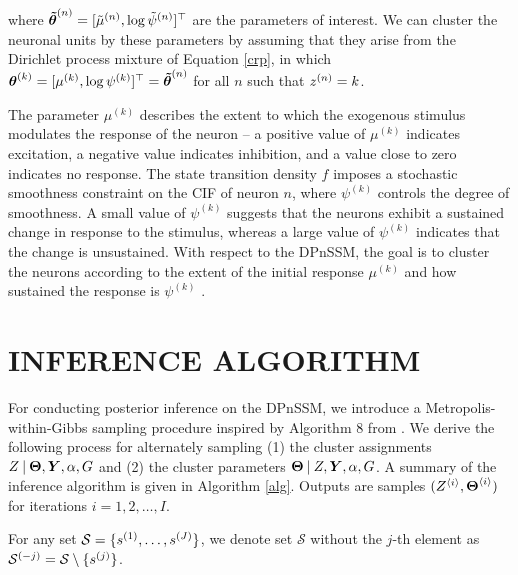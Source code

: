 \documentclass[twoside]{article}
\begin{document}
where $\boldsymbol{\tilde{\theta}}^{(n)}_{} = [{\tilde{\mu}}^{(n)}_{}, \log {\tilde{\psi}}^{(n)}_{}]^\top$ are the parameters of interest.  We can cluster the neuronal units by these parameters by assuming that they arise from the Dirichlet process mixture of Equation \ref{crp}, in which $\boldsymbol{\theta}^{(k)}_{} = [{\mu}^{(k)}_{}, \log {\psi}^{(k)}_{}]^\top = \boldsymbol{\tilde{\theta}}^{(n)}_{}$ for all $n$ such that ${z}^{(n)}_{} = k$.  

The parameter $\mu^{(k)} $ describes the extent to which the exogenous stimulus modulates the response of the neuron -- a positive value of $\mu^{(k)}$ indicates excitation, a negative value indicates inhibition, and a value close to zero indicates no response. The state transition density $f$ imposes a stochastic smoothness constraint on the CIF of neuron $n$, where $\psi^{(k)}$ controls the degree of smoothness.  A small value of $\psi^{(k)}$ suggests that the neurons exhibit a sustained change in response to the stimulus, whereas a large value of $\psi^{(k)}$ indicates that the change is unsustained.  With respect to the DPnSSM, the goal is to cluster the neurons according to the extent of the initial response $\mu^{(k)}$ and how sustained the response is $\psi^{(k)}$ . 

\section{INFERENCE ALGORITHM}
For conducting posterior inference on the DPnSSM, we introduce a Metropolis-within-Gibbs sampling procedure inspired by Algorithm 8 from \cite{neal2000markov}.  We derive the following process for alternately sampling (1) the cluster assignments $Z \:\vert\: \boldsymbol{\Theta}, \boldsymbol{Y}, \alpha, G$ and (2) the cluster parameters $\boldsymbol{\Theta} \:\vert\: Z, \boldsymbol{Y}, \alpha, G$.  A summary of the inference algorithm is given in Algorithm \ref{alg}. Outputs are samples $(Z^{\langle i\rangle}_{}, \boldsymbol{\Theta}^{\langle i\rangle}_{})$ for iterations $i = 1, 2, \ldots, I$.

For any set $\mathcal{S} = \{{s}^{(1)}_{}, \ldots, {s}^{(J)}_{}\}$, we denote set $\mathcal{S}$ without the $j$-th element as ${\mathcal{S}}^{(-j)}_{} = \mathcal{S} \setminus \{{s}^{(j)}_{}\}$.
\end{document}
